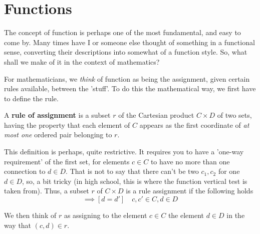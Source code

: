 \section{Functions}
The concept of function is perhaps one of the most fundamental, and easy to come by. Many times have I or someone else thought of something in a functional sense, converting their descriptions into somewhat of a function style. So, what shall we make of it in the context of mathematics? 

For mathematicians, we \textit{think} of function as being the assignment, given certain rules available, between the 'stuff'. To do this the mathematical way, we first have to define the rule. 
\begin{definition}
    A \textbf{rule of assignment} is a subset $r$ of the Cartesian product $C\times D$ of two sets, having the property that each element of $C$ appears as the first coordinate of \textit{at most one} ordered pair belonging to $r$. 
\end{definition}

This definition is perhaps, quite restrictive. It requires you to have a 'one-way requirement' of the first set, for elements $c\in C$ to have no more than one connection to $d\in D$. That is not to say that there can't be two $c_1, c_2$ for one $d\in D$, so, a bit tricky (in high school, this is where the function vertical test is taken from). Thus, a subset $r$ of $C\times D$ is a rule assignment if the following holds
\begin{equation}
    [(c,d)\in r \land (c,d')\in r]\implies [d=d']\quad c,c'\in C, d\in D 
\end{equation}

We then think of $r$ as assigning to the element $c\in C$ the element $d\in D$ in the way that $(c,d)\in r$. 

